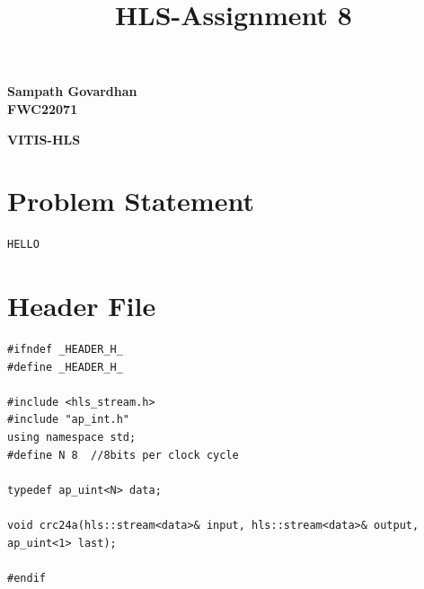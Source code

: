 \documentclass{article}
\title{
HLS-Assignment 8
}
\begin{document}
\maketitle
\hfill \textbf{Sampath Govardhan} \\
\null \hfill \textbf{FWC22071}\\
\maketitle
\hfill \textbf{VITIS-HLS}
\section{Problem Statement}
\begin{lstlisting}
HELLO
\end{lstlisting}
\vspace{6cm}
\section{Header File}
\begin{lstlisting}
#ifndef _HEADER_H_
#define _HEADER_H_

#include <hls_stream.h>
#include "ap_int.h"
using namespace std;
#define N 8  //8bits per clock cycle

typedef ap_uint<N> data;

void crc24a(hls::stream<data>& input, hls::stream<data>& output, ap_uint<1> last);

#endif


\end{lstlisting}

\vspace{15cm}
\end{document}
